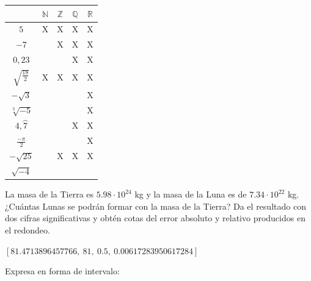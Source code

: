 \documentclass[addpoints,spanish, 12pt,a4paper]{exam}
\begin{document}
\begin{questions}
\begin{solution}
\begin{tabular}{|c |c |c |c |c|}\hline
&$\mathbb{N}$& $\mathbb{Z}$& $\mathbb{Q}$&$\mathbb{R}$\\ 
\hline
$5$&X&X&X&X\\
\hline
$-7$&&X&X&X\\
\hline
$0,23$&&&X&X\\
\hline
$\sqrt{\frac{18}{2}}$&X&X&X&X\\
\hline
$-\sqrt{3}$&&&&X\\
\hline
$\sqrt[3]{-5}$&&&&X\\
\hline
$4,\wideparen{7}$&&&X&X\\
\hline
$\frac{-\pi}{2}$&&&&X\\
\hline
$-\sqrt{25}$&&X&X&X\\
\hline
$\sqrt{-4}$&&&&\\
\hline
\end{tabular}
\end{solution}

\addpoints

\question[2] La masa de la Tierra es $5.98\cdot 10^{24}$ kg y la masa de la Luna es de $7.34\cdot 10^{22}$ kg. ¿Cuántas Lunas se podrán formar con la masa de la Tierra? Da el resultado con dos cifras significativas y obtén cotas del error absoluto y relativo producidos en el redondeo.

\begin{solution}
 	$\left[ 81.4713896457766, \  81, \  0.5, \  0.00617283950617284\right]$ 
 
\end{solution}



 

\question[1] Expresa en forma de intervalo:

\end{questions}
\end{document}

